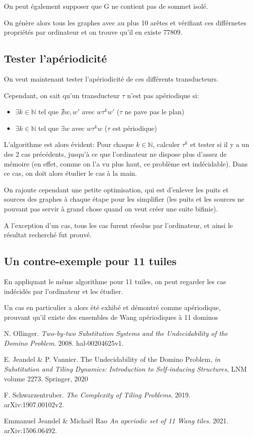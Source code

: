 \documentclass{scrartcl}
\newcommand{\N}{\mathbb N}
\theoremstyle{definition}
\theoremstyle{remark}
\begin{document}
On peut également supposer que G ne contient pas de sommet isolé.

On génère alors tous les graphes avec au plus 10 arêtes et vérifiant ces différnetes propriétés par ordinateur
et on trouve qu'il en existe 77809.

\subsection{Tester l'apériodicité}

On veut maintenant tester l'apériodicité de ces différents transducteurs.

Cependant, on sait qu'un transducteur $\tau$ n'est pas apériodique si:

\begin{itemize}
    \item $\exists k \in \N$ tel que $\nexists w,w'$ avec $w \tau^k w'$ ($\tau$ ne pave pas le plan)
    \item $\exists k \in \N$ tel que $\exists w$ avec $w \tau^k w$ ($\tau$ est périodique)
\end{itemize}

L'algorithme est alors évident: Pour chaque $k \in \N$, calculer $\tau^k$ et tester si il y a un des 2 cas précédents,
jusqu'à ce que l'ordinateur ne dispose plus d'assez de mémoire (en effet, comme on l'a vu plus haut, ce problème est indécidable).
Dans ce cas, on doit alors étudier le cas à la main.

On rajoute cependant une petite optimisation, qui est d'enlever les puits et sources des graphes à chaque étape pour les simplifier
(les puits et les sources ne pouvant pas servir à grand chose quand on veut créer une suite bifinie).

A l'exception d'un cas, tous les cas furent résolus par l'ordinateur, et ainsi le résultat recherché fut prouvé.

\subsection{Un contre-exemple pour 11 tuiles}
En appliquant le même algorithme pour 11 tuiles, on peut regarder les cas indécidés par l'ordinateur et les étudier.

Un cas en particulier a alors été exhibé et démontré comme apériodique, prouvant qu'il existe des ensembles de Wang
apériodiques à 11 dominos

\begin{thebibliography}{9}

   N. Ollinger. \emph{Two-by-two Substitution Systems and the Undecidability of the Domino Problem}. 2008. hal-00204625v1.
  
   E. Jeandel \& P. Vannier. The Undecidability of the Domino Problem, \emph{in} \emph{Substitution and Tiling Dynamics: Introduction to Self-inducing Structures}, LNM volume 2273. Springer, 2020

   F. Schwarzentruber. \emph{The Complexity of Tiling Problems}. 2019. arXiv:1907.00102v2.

   Emmanuel Jeandel \& Michaël Rao \emph{An aperiodic set of 11 Wang tiles}. 2021. arXiv:1506.06492.
\end{thebibliography}
\end{document}
